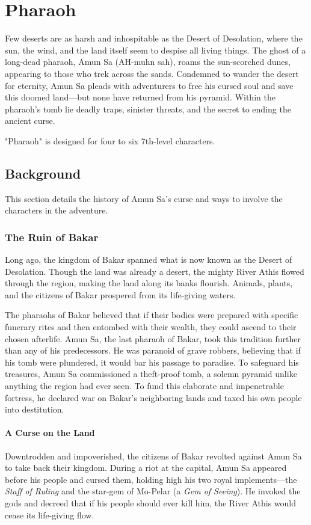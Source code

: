 \documentclass[10pt,a4paper,twoside,bg=print,twocolumn,openany,nodeprecatedcode]{dndbook}
\begin{document}
\chapter{Pharaoh}
Few deserts are as harsh and inhospitable as the Desert of Desolation, where the sun, the wind, and the land itself seem to despise all living things. The ghost of a long-dead pharaoh, Amun Sa (AH-muhn sah), roams the sun-scorched dunes, appearing to those who trek across the sands. Condemned to wander the desert for eternity, Amun Sa pleads with adventurers to free his cursed soul and save this doomed land—but none have returned from his pyramid. Within the pharaoh's tomb lie deadly traps, sinister threats, and the secret to ending the ancient curse.

"Pharaoh" is designed for four to six 7th-level characters.

\section{Background}
This section details the history of Amun Sa's curse and ways to involve the characters in the adventure.

\subsection{The Ruin of Bakar}
Long ago, the kingdom of Bakar spanned what is now known as the Desert of Desolation. Though the land was already a desert, the mighty River Athis flowed through the region, making the land along its banks flourish. Animals, plants, and the citizens of Bakar prospered from its life-giving waters.

The pharaohs of Bakar believed that if their bodies were prepared with specific funerary rites and then entombed with their wealth, they could ascend to their chosen afterlife. Amun Sa, the last pharaoh of Bakar, took this tradition further than any of his predecessors. He was paranoid of grave robbers, believing that if his tomb were plundered, it would bar his passage to paradise. To safeguard his treasures, Amun Sa commissioned a theft-proof tomb, a solemn pyramid unlike anything the region had ever seen. To fund this elaborate and impenetrable fortress, he declared war on Bakar's neighboring lands and taxed his own people into destitution.

\subsubsection{A Curse on the Land}
Downtrodden and impoverished, the citizens of Bakar revolted against Amun Sa to take back their kingdom. During a riot at the capital, Amun Sa appeared before his people and cursed them, holding high his two royal implements—the \textit{Staff of Ruling} and the star-gem of Mo-Pelar (a \textit{Gem of Seeing}). He invoked the gods and decreed that if his people should ever kill him, the River Athis would cease its life-giving flow.
\end{document}
